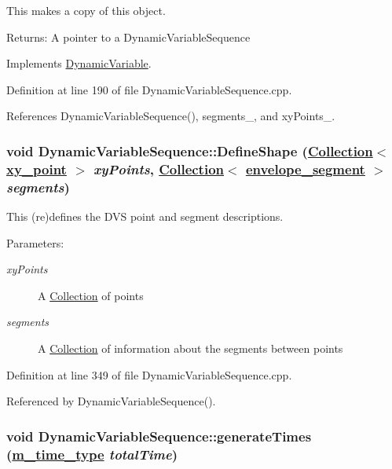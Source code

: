 This makes a copy of this object. \begin{Desc}
\item[Returns:]A pointer to a Dynamic\-Variable\-Sequence \end{Desc}


Implements \hyperlink{classDynamicVariable_a2}{Dynamic\-Variable}.

Definition at line 190 of file Dynamic\-Variable\-Sequence.cpp.

References Dynamic\-Variable\-Sequence(), segments\_\-, and xy\-Points\_\-.\hypertarget{classDynamicVariableSequence_a7}{
\subsubsection[DefineShape]{\setlength{\rightskip}{0pt plus 5cm}void Dynamic\-Variable\-Sequence::Define\-Shape (\hyperlink{classCollection}{Collection}$<$ \hyperlink{structxy__point}{xy\_\-point} $>$ {\em xy\-Points}, \hyperlink{classCollection}{Collection}$<$ \hyperlink{structenvelope__segment}{envelope\_\-segment} $>$ {\em segments})}}
\label{classDynamicVariableSequence_a7}


This (re)defines the DVS point and segment descriptions. \begin{Desc}
\item[Parameters:]
\begin{description}
\item[{\em xy\-Points}]A \hyperlink{classCollection}{Collection} of points \item[{\em segments}]A \hyperlink{classCollection}{Collection} of information about the segments between points \end{description}
\end{Desc}


Definition at line 349 of file Dynamic\-Variable\-Sequence.cpp.

Referenced by Dynamic\-Variable\-Sequence().\hypertarget{classDynamicVariableSequence_d1}{
\subsubsection[generateTimes]{\setlength{\rightskip}{0pt plus 5cm}void Dynamic\-Variable\-Sequence::generate\-Times (\hyperlink{Types_8h_a2}{m\_\-time\_\-type} {\em total\-Time})}}
\label{classDynamicVariableSequence_d1}


